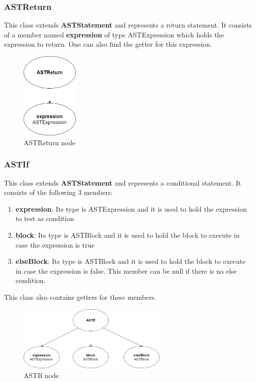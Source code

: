 \documentclass{article}
\begin{document}
					\subsubsection{ASTReturn}
					
					This class extends \textbf{ASTStatement} and represents a return statement. It consists of a member named \textbf{expression} of type ASTExpression which holds the expression to return. One can also find the getter for this expression.		
					
					\begin{figure}[H]
					\centering
			 			\includegraphics[width=0.25\textwidth]{astreturn.png}
			  			\caption{{ASTReturn} node}
			  			\label{fig:astreturn}
					\end{figure}	 
			
					\subsubsection{ASTIf}
					
					This class extends \textbf{ASTStatement} and represents a conditional statement. It consists of the following 3 members:
					
							\begin{enumerate}
					\item \textbf{expression}: Its type is ASTExpression and it is used to hold the expression to test as condition
					\item \textbf{block}: Its type is ASTBlock and it is used to hold the block to execute in case the expression is true
					\item \textbf{elseBlock}: Its type is ASTBlock and it is used to hold the block to execute in case the expression is false. This member can be null if there is no else condition.
					\end{enumerate}	
					This class also contains getters for these members.
					
					\begin{figure}[H]
					\centering
			 			\includegraphics[width=0.65\textwidth]{astif.png}
			  			\caption{{ASTIf} node}
			  			\label{fig:astif}
					\end{figure}	 
			
\end{document}

